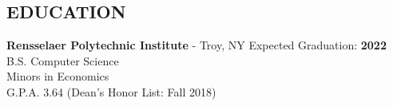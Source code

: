 \documentclass{res}
\begin{document}

\address{\bf  ADDRESS\\11 Riverside Drive APT 7WE\\New York, NY 10023}
\address{\bf Contact Info \\ eli@elischiff.org \\   (646) 574-5224}

\begin{resume}


\section{EDUCATION}
    {\bf Rensselaer Polytechnic Institute} - Troy, NY \hfill Expected Graduation: {\bf 2022} \\
    B.S. Computer Science   \\
    Minors in Economics  \\
    G.P.A. 3.64 (Dean's Honor List: Fall 2018)



\end{resume}
\end{document}
